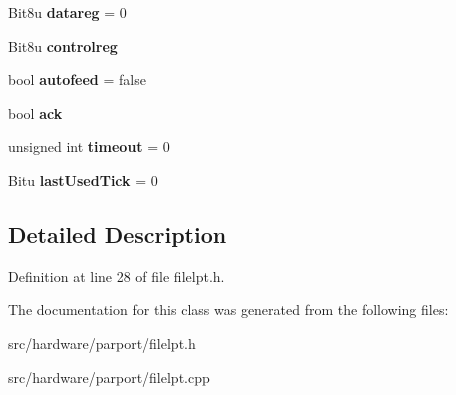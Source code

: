 \begin{DoxyCompactItemize}
\item 
\hypertarget{classCFileLPT_ad59a42373cdb6ae50b983b744b79451e}{Bit8u {\bfseries datareg} = 0}\label{classCFileLPT_ad59a42373cdb6ae50b983b744b79451e}

\item 
\hypertarget{classCFileLPT_a9ad1361fb9df3fe768573f46206c248d}{Bit8u {\bfseries controlreg}}\label{classCFileLPT_a9ad1361fb9df3fe768573f46206c248d}

\item 
\hypertarget{classCFileLPT_ab146dfe78d718cee82c107ed8f1d68d1}{bool {\bfseries autofeed} = false}\label{classCFileLPT_ab146dfe78d718cee82c107ed8f1d68d1}

\item 
\hypertarget{classCFileLPT_a2342d7014c2898698d2d78c4a4021fa5}{bool {\bfseries ack}}\label{classCFileLPT_a2342d7014c2898698d2d78c4a4021fa5}

\item 
\hypertarget{classCFileLPT_a8575730cacb5d26414d99f944caa4f66}{unsigned int {\bfseries timeout} = 0}\label{classCFileLPT_a8575730cacb5d26414d99f944caa4f66}

\item 
\hypertarget{classCFileLPT_a96dce00b435b57411c44492ed04d129a}{Bitu {\bfseries last\-Used\-Tick} = 0}\label{classCFileLPT_a96dce00b435b57411c44492ed04d129a}

\end{DoxyCompactItemize}


\subsection{Detailed Description}


Definition at line 28 of file filelpt.\-h.



The documentation for this class was generated from the following files\-:\begin{DoxyCompactItemize}
\item 
src/hardware/parport/filelpt.\-h\item 
src/hardware/parport/filelpt.\-cpp\end{DoxyCompactItemize}
